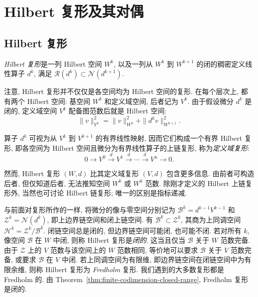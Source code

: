 \section{{Hilbert 复形及其对偶}}\label{sec:hilbert-complexes-duals}

\subsection{{Hilbert 复形}}\label{subsec:hilbert-complexes-definition}


\begin{Definition}\label{def:hilbert-complex}
{\emph{Hilbert 复形}是一列 Hilbert 空间 $W^k$, 以及一列从 $W^k$ 到 $W^{k+1}$ 的闭的稠密定义线性算子 $d^k$, 满足 $\mathcal R(d^k)\subset\mathcal N(d^{k+1})$.}
\end{Definition}

{注意, Hilbert 复形并不仅仅是各空间均为 Hilbert 空间的复形. 在每个层次上, 都有两个 Hilbert 空间: 基空间 $W^k$ 和定义域空间, 后者记为 $V^k$. 由于假设微分 $d^k$ 是闭的, 定义域空间 $V^k$ 配备图范数后就是 Hilbert 空间:}
\[
\|v\|_{V^k}^2=\|v\|_{W^k}^2+\|d^k v\|_{W^{k+1}}^2.
\]

{算子 $d^k$ 可视为从 $V^k$ 到 $V^{k+1}$ 的有界线性映射, 因而它们构成一个有界 Hilbert 复形, 即各空间为 Hilbert 空间且微分为有界线性算子的上链复形, 称为\emph{定义域复形}:}
\begin{equation}\label{eq:hilbert-domain-complex}
0\to V^0\xrightarrow{d}V^1\xrightarrow{d}\cdots\xrightarrow{d}V^n\to0.
\end{equation}

{然而, Hilbert 复形 $(W,d)$ 比其定义域复形 $(V,d)$ 包含更多信息. 由前者可构造后者, 但仅知道后者, 无法推知空间 $W^k$ 或 $W^k$ 范数. 除刚才定义的 Hilbert 上链复形外, 当然也可讨论 Hilbert 链复形; 唯一的区别是指标递减.}

{与前面对复形所作的一样, 将微分的像与零空间分别记为 $\mathcal B^k=d^{k-1}V^{k-1}$ 和 $\mathcal Z^k=\mathcal N(d^k)$, 即上边界链空间和闭上链空间. 有 $\mathcal B^k\subset\mathcal Z^k$, 其商为上同调空间 $\mathcal H^k=\mathcal Z^k/\mathcal B^k$. 闭链空间总是闭的, 但边界链空间可能闭, 也可能不闭. 若对所有 $k$, 像空间 $\mathcal B$ 在 $W$ 中闭, 则称 Hilbert 复形是\emph{闭的}. 这当且仅当 $\mathcal B$ 关于 $W$ 范数完备. 由于 $\mathcal Z$ 上的 $V$ 范数与该空间上的 $W$ 范数相同, 等价地可以要求 $\mathcal B$ 关于 $V$ 范数完备, 或要求 $\mathcal B$ 在 $V$ 中闭. 若上同调空间为有限维, 即边界链空间在闭链空间中为有限余维, 则称 Hilbert 复形为 \emph{Fredholm} 复形. 我们遇到的大多数复形都是 Fredholm 的. 由 Theorem~\ref{thm:finite-codimension-closed-range}, Fredholm 复形是闭的.}

